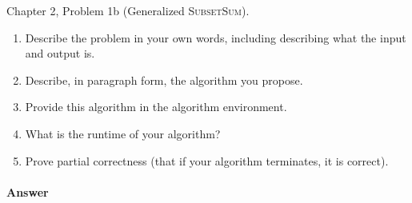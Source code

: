 \documentclass{article}
\begin{document}

\nextprob
{}

Chapter 2, Problem 1b (Generalized \textsc{SubsetSum}).
\begin{enumerate}
    \item Describe the problem in your own words, including
        describing what the input and output is.
    \item Describe, in paragraph form, the algorithm you propose.
    \item Provide this algorithm in the algorithm environment.
    \item What is the runtime of your algorithm?
    \item Prove partial correctness (that if your algorithm terminates, it is
        correct).
\end{enumerate}


\paragraph{Answer}

\end{document}
